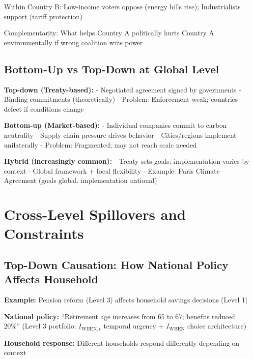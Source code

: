 Within Country B: Low-income voters oppose (energy bills rise); Industrialists support (tariff protection)

Complementarity: What helps Country A politically hurts Country A environmentally if wrong coalition wins power

\subsection{Bottom-Up vs Top-Down at Global Level}

\textbf{Top-down (Treaty-based):}
- Negotiated agreement signed by governments
- Binding commitments (theoretically)
- Problem: Enforcement weak; countries defect if conditions change

\textbf{Bottom-up (Market-based):}
- Individual companies commit to carbon neutrality
- Supply chain pressure drives behavior
- Cities/regions implement unilaterally
- Problem: Fragmented; may not reach scale needed

\textbf{Hybrid (increasingly common):}
- Treaty sets goals; implementation varies by context
- Global framework + local flexibility
- Example: Paris Climate Agreement (goals global, implementation national)


\section{Cross-Level Spillovers and Constraints}
\label{sec:cross-level-spillovers}

\subsection{Top-Down Causation: How National Policy Affects Household}

\textbf{Example:} Pension reform (Level 3) affects household savings decisions (Level 1)

\textbf{National policy:} ``Retirement age increases from 65 to 67; benefits reduced 20\%'' (Level 3 portfolio: $I_{\text{WHEN},t}$ temporal urgency + $I_{\text{WHEN}}$ choice architecture)

\textbf{Household response:} Different households respond differently depending on context

